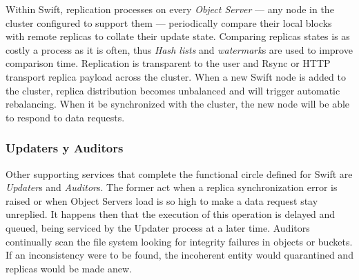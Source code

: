 Within Swift, replication processes on every \emph{Object Server} --- any node in the cluster configured to support them --- periodically compare their local blocks with remote replicas to collate their update state. Comparing replicas states is as costly a process as it is often, thus \emph{Hash lists} and \emph{watermark}s are used to improve comparison time. Replication is transparent to the user and Rsync or HTTP transport replica payload across the cluster. When a new Swift node is added to the cluster, replica distribution becomes unbalanced and will trigger automatic rebalancing. When it be synchronized with the cluster, the new node will be able to respond to data requests.

\subsubsection{Updaters y Auditors}\label{subsubsec:otroscompswift}
\noindent Other supporting services that complete the functional circle defined for Swift are \emph{Updater}s and \emph{Auditor}s. The former act when a replica synchronization error is raised or when Object Servers load is so high to make a data request stay unreplied. It happens then that the execution of this operation is delayed and queued, being serviced by the Updater process at a later time. Auditors continually scan the file system looking for integrity failures in objects or buckets. If an inconsistency were to be found, the incoherent entity would quarantined and replicas would be made anew.
